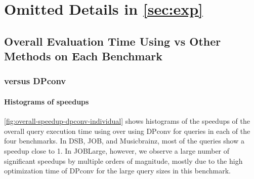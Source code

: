 \newpage
\section{Omitted Details in \cref{sec:exp}}
\label{app:exp}

\subsection{Overall Evaluation Time Using \sys{} vs Other Methods on Each Benchmark}

\subsubsection{\sys{} versus DPconv}
\label{app:total-time-dpconv-individual}

\paragraph{Histograms of speedups}
\cref{fig:overall-speedup-dpconv-individual} shows histograms of the speedups of the overall query execution time using \sys{} over using DPconv for queries in each of the four benchmarks. In DSB, JOB, and Musicbrainz, most of the queries show a speedup close to 1. In JOBLarge, however, we observe a large number of significant speedups by multiple orders of magnitude, mostly due to the high optimization time of DPconv for the large query sizes in this benchmark.

